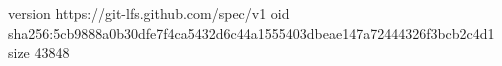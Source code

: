 version https://git-lfs.github.com/spec/v1
oid sha256:5cb9888a0b30dfe7f4ca5432d6c44a1555403dbeae147a72444326f3bcb2c4d1
size 43848
